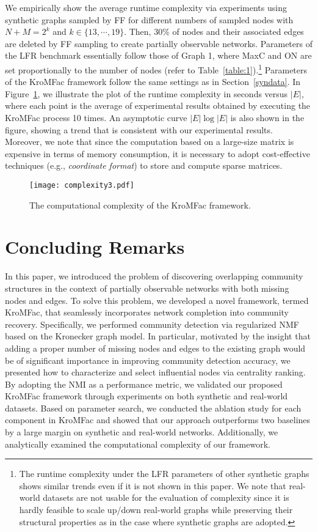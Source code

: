\documentclass[format=acmsmall, review=false, screen=true]{acmart}
\def \log{\operatorname{log}}
\begin{document}
We empirically show the average runtime complexity via experiments using synthetic graphs sampled by FF for different numbers of sampled nodes with $N+M = 2^k$ and $k \in \{13,\cdots,19\}$. Then, 30\% of nodes  and their associated edges are deleted by FF sampling to create partially observable networks. Parameters of the LFR benchmark essentially follow those of Graph 1, where MaxC and ON are set proportionally to the number of nodes (refer to Table~\ref{table:1}).\footnote{The runtime complexity under the LFR parameters of other synthetic graphs shows similar trends even if it is not shown in this paper. We note that real-world datasets are not usable for the evaluation of complexity since it is hardly feasible to scale up/down real-world graphs while preserving their structural properties as in the case where synthetic graphs are adopted.} Parameters of the \textsf{KroMFac} framework follow the same settings as in Section~\ref{syndata}. In Figure~\ref{fig:complexity}, we illustrate the plot of the runtime complexity in seconds versus $|E|$, where each point is the average of experimental results obtained by executing the \textsf{KroMFac} process 10 times. An asymptotic curve $|E|\log|E|$ is also shown in the figure, showing a trend that is consistent with our experimental results.
Moreover, we note that since the computation based on a large-size matrix is expensive in terms of memory consumption, it is necessary to adopt cost-effective techniques  (e.g., {\em coordinate format}) to store and compute sparse matrices.
\begin{figure}[t]
\centering
\texttt{[image: complexity3.pdf]}
\caption{The computational complexity of the \textsf{KroMFac} framework.}
\label{fig:complexity}
\end{figure}

\section{Concluding Remarks}\label{sec:6}
 In this paper, we introduced the problem of discovering overlapping community structures in the context of partially observable networks with both missing nodes and edges. To solve this problem, we developed a novel framework, termed \textsf{KroMFac}, that seamlessly incorporates network completion into community recovery. Specifically, we performed community detection  via regularized NMF based on the Kronecker graph model. In particular, motivated by the insight that adding a proper number of missing nodes and edges to the existing graph would be of significant importance in improving community detection accuracy, we presented how to characterize and select influential nodes via centrality ranking. By adopting the NMI as a performance metric, we validated our proposed \textsf{KroMFac} framework through experiments on both synthetic and real-world datasets. Based on parameter search, we conducted the ablation study for each component in \textsf{KroMFac} and showed that our approach outperforms two baselines by a large margin on synthetic and real-world networks. Additionally, we analytically examined the computational complexity of our framework.
\end{document}
